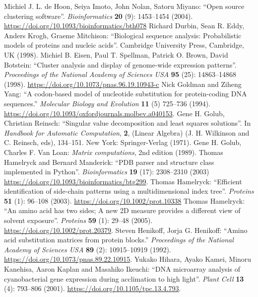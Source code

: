 \documentclass{report}
\begin{document}
\begin{thebibliography}{99}
Michiel J. L. de Hoon, Seiya Imoto, John Nolan, Satoru Miyano: ``Open source clustering software''. \textit{Bioinformatics} {\bf 20} (9): 1453--1454 (2004).  \url{https://doi.org/10.1093/bioinformatics/bth078}
Richard Durbin, Sean R. Eddy, Anders Krogh, Graeme Mitchison:
``Biological sequence analysis: Probabilistic models of proteins and nucleic acids''.  Cambridge University Press, Cambridge, UK (1998).
Michiel B. Eisen, Paul T. Spellman, Patrick O. Brown, David Botstein: ``Cluster analysis and display of genome-wide expression patterns''. \textit{Proceedings of the National Academy of Sciences USA} {\bf 95} (25): 14863--14868 (1998). \url{https://doi.org/10.1073/pnas.96.19.10943-c}
Nick Goldman and Ziheng Yang: ``A codon-based model of nucleotide substitution for protein-coding DNA sequences.'' \textit{Molecular Biology and Evolution} {\bf 11} (5) 725--736 (1994). \url{https://doi.org/10.1093/oxfordjournals.molbev.a040153}.
Gene H. Golub, Christian Reinsch: ``Singular value decomposition and least squares solutions''. In \textit{Handbook for Automatic Computation}, {\bf 2}, (Linear Algebra) (J. H. Wilkinson and C. Reinsch, eds), 134--151. New York: Springer-Verlag (1971).
Gene H. Golub, Charles F. Van Loan: \textit{Matrix computations}, 2nd edition (1989).
Thomas Hamelryck and Bernard Manderick: ``PDB parser and structure class implemented in Python''. \textit{Bioinformatics} \textbf{19} (17): 2308--2310 (2003) \url{https://doi.org/10.1093/bioinformatics/btg299}.
Thomas Hamelryck: ``Efficient identification of side-chain patterns using a multidimensional index tree''. \textit{Proteins} {\bf 51} (1): 96--108 (2003).  \url{https://doi.org/10.1002/prot.10338}
Thomas Hamelryck: ``An amino acid has two sides; A new 2D measure provides a different view of solvent exposure''. \textit{Proteins} {\bf 59} (1): 29--48 (2005).  \url{https://doi.org/10.1002/prot.20379}.
Steven Henikoff, Jorja G. Henikoff: ``Amino acid substitution matrices from protein blocks.'' \textit{Proceedings of the National Academy of Sciences USA} {\bf 89} (2): 10915--10919 (1992). \url{https://doi.org/10.1073/pnas.89.22.10915}.
Yukako Hihara, Ayako Kamei, Minoru Kanehisa, Aaron Kaplan and Masahiko Ikeuchi: ``DNA microarray analysis of cyanobacterial gene expression during acclimation to high light''. \textit{Plant Cell} {\bf 13} (4): 793--806 (2001). \url{https://doi.org/10.1105/tpc.13.4.793}.

\end{thebibliography}
\end{document}

